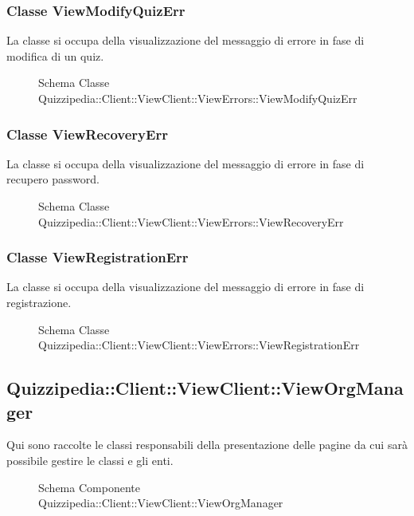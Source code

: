 \subsubsection{Classe ViewModifyQuizErr}
La classe si occupa della visualizzazione del messaggio di errore in fase di modifica di un quiz.
\begin{figure}[H]
\centering
\noindent{}
\caption[Schema Classe ViewModifyQuizErr]{Schema Classe Quizzipedia::Client::ViewClient::ViewErrors::ViewModifyQuizErr}
\end{figure}
\subsubsection{Classe ViewRecoveryErr}
La classe si occupa della visualizzazione del messaggio di errore in fase di recupero password.
\begin{figure}[H]
\centering
\noindent{}
\caption[Schema Classe ViewRecoveryErr]{Schema Classe Quizzipedia::Client::ViewClient::ViewErrors::ViewRecoveryErr}
\end{figure}
\subsubsection{Classe ViewRegistrationErr}
La classe si occupa della visualizzazione del messaggio di errore in fase di registrazione.
\begin{figure}[H]
\centering
\noindent{}
\caption[Schema Classe ViewRegistrationErr]{Schema Classe Quizzipedia::Client::ViewClient::ViewErrors::ViewRegistrationErr}
\end{figure}
\subsection{Quizzipedia::Client::ViewClient::ViewOrgManager}
Qui sono raccolte le classi responsabili della presentazione delle pagine da cui sarà possibile gestire le classi e gli enti.
\begin{figure}[H]
\centering
\noindent{}
\caption[Schema Componente Quizzipedia::Client::ViewClient::ViewOrgManager]{Schema Componente Quizzipedia::Client::ViewClient::ViewOrgManager}
\end{figure}
